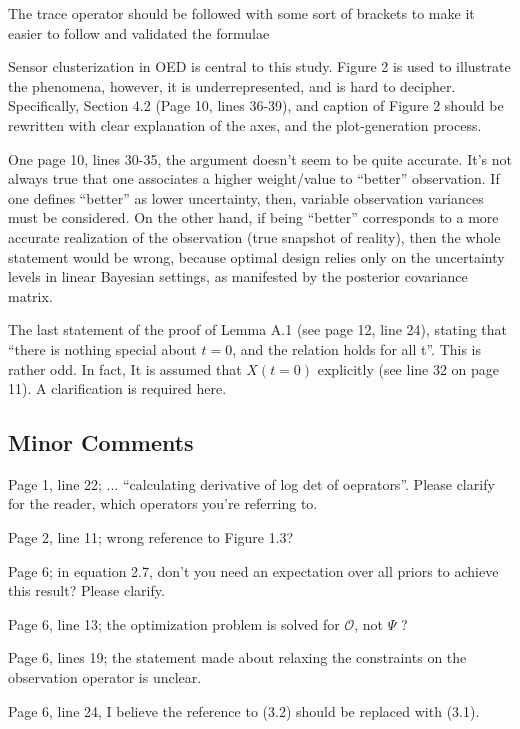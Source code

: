 \documentclass{amsart}
\begin{document}
The trace operator should be followed with some sort of brackets to
make it easier to follow and validated the formulae

Sensor clusterization in OED is central to this study. Figure 2 is
used to illustrate the phenomena, however, it is underrepresented, and
is hard to decipher. Specifically, Section 4.2 (Page 10, lines 36-39),
and caption of Figure 2 should be rewritten with clear explanation of
the axes, and the plot-generation process.

One page 10, lines 30-35, the argument doesn't seem to be quite
accurate. It's not always true that one associates a higher
weight/value to ``better'' observation. If one defines ``better'' as
lower uncertainty, then, variable observation variances must be
considered. On the other hand, if being ``better'' corresponds to a
more accurate realization of the observation (true snapshot of
reality), then the whole statement would be wrong, because optimal
design relies only on the uncertainty levels in linear Bayesian
settings, as manifested by the posterior covariance matrix.

The last statement of the proof of Lemma A.1 (see page 12, line 24),
stating that ``there is nothing special about $t=0$, and the relation
holds for all t''. This is rather odd. In fact, It is assumed that
$X(t=0)$ explicitly (see line 32 on page 11). A clarification is
required here.



\subsection{Minor Comments}

Page 1, line 22; ... ``calculating derivative of log det of
oeprators''. Please clarify for the reader, which operators you're
referring to.

Page 2, line 11; wrong reference to Figure 1.3?

Page 6; in equation 2.7, don't you need an expectation over all priors
to achieve this result? Please clarify.

Page 6, line 13; the optimization problem is solved for $\mathcal{O}$,
not $\Psi$ ?

Page 6, lines 19; the statement made about relaxing the constraints on
the observation operator is unclear.

Page 6, line 24, I believe the reference to (3.2) should be replaced
with (3.1).
\end{document}
